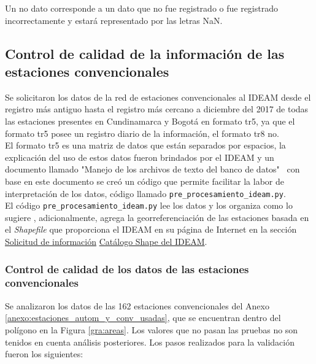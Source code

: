 Un no dato corresponde a un dato que no fue registrado o fue registrado incorrectamente y estará representado por las letras NaN.

\subsection{Control de calidad de la información de las estaciones convencionales}

Se solicitaron los datos de la red de estaciones convencionales al IDEAM desde el registro más antiguo hasta el registro más cercano a diciembre del 2017 de todas las estaciones presentes en Cundinamarca y Bogotá en formato tr5, ya que el formato tr5 posee un registro diario de la información, el formato tr8 no.\\

El formato tr5 es una matriz de datos que están separados por espacios, la explicación del uso de estos datos fueron brindados por el IDEAM y un documento llamado "Manejo de los archivos de texto del banco de datos"\ \citep{pedraza2015} con base en este documento se creó un código que permite facilitar la labor de interpretación de los datos, código llamado \texttt{pre\_procesamiento\_ideam.py}.\\

El código \texttt{pre\_procesamiento\_ideam.py} lee los datos y los organiza como lo sugiere \citet{pedraza2015}, adicionalmente, agrega la georreferenciación de las estaciones basada en el \textit{Shapefile} que proporciona el IDEAM en su página de Internet en la sección  \textcolor{blue}{ \href{http://www.ideam.gov.co/solicitud-de-informacion}{Solicitud de información}} \textcolor{blue}{ \href{institucional.ideam.gov.co/jsp/info/institucional/publicaciones/CATALOGO_ESTACIONES_IDEAM_V10_AGOSTO2017.zip}{Catálogo Shape del IDEAM}}.\\


\subsubsection{Control de calidad de los datos de las estaciones convencionales}

Se analizaron los datos de las 162 estaciones convencionales del Anexo \ref{anexo:estaciones_autom_y_conv_usadas},  que se encuentran dentro del polígono en la Figura \ref{gra:areas}. Los valores que no pasan las pruebas no son tenidos en cuenta análisis posteriores. Los pasos realizados para la validación fueron los siguientes:\\

